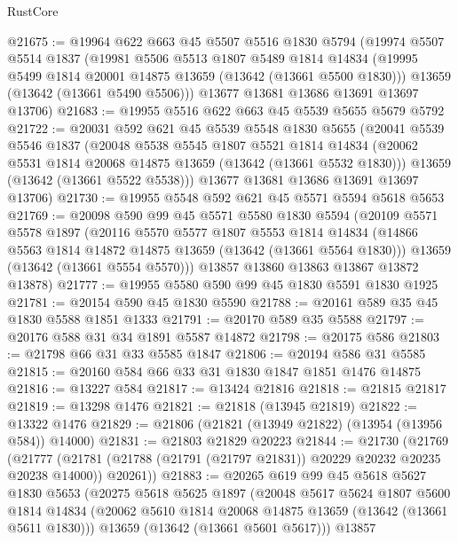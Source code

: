 \begin{lexlean}{RustCore}
\begin{coremodule}
@21675 := @19964
    @622
    @663
    @45
    @5507
    @5516
    @1830
    @5794
    (@19974
      @5507
      @5514
      @1837
      (@19981
        @5506
        @5513
        @1807
        @5489
        @1814
        @14834
        (@19995 @5499 @1814 @20001 @14875 @13659 (@13642 (@13661 @5500 @1830)))
        @13659
        (@13642 (@13661 @5490 @5506)))
      @13677
      @13681
      @13686
      @13691
      @13697
      @13706)
@21683 := @19955 @5516 @622 @663 @45 @5539 @5655 @5679 @5792
@21722 := @20031
    @592
    @621
    @45
    @5539
    @5548
    @1830
    @5655
    (@20041
      @5539
      @5546
      @1837
      (@20048
        @5538
        @5545
        @1807
        @5521
        @1814
        @14834
        (@20062 @5531 @1814 @20068 @14875 @13659 (@13642 (@13661 @5532 @1830)))
        @13659
        (@13642 (@13661 @5522 @5538)))
      @13677
      @13681
      @13686
      @13691
      @13697
      @13706)
@21730 := @19955 @5548 @592 @621 @45 @5571 @5594 @5618 @5653
@21769 := @20098
    @590
    @99
    @45
    @5571
    @5580
    @1830
    @5594
    (@20109
      @5571
      @5578
      @1897
      (@20116
        @5570
        @5577
        @1807
        @5553
        @1814
        @14834
        (@14866 @5563 @1814 @14872 @14875 @13659 (@13642 (@13661 @5564 @1830)))
        @13659
        (@13642 (@13661 @5554 @5570)))
      @13857
      @13860
      @13863
      @13867
      @13872
      @13878)
@21777 := @19955 @5580 @590 @99 @45 @1830 @5591 @1830 @1925
@21781 := @20154 @590 @45 @1830 @5590
@21788 := @20161 @589 @35 @45 @1830 @5588 @1851 @1333
@21791 := @20170 @589 @35 @5588
@21797 := @20176 @588 @31 @34 @1891 @5587 @14872
@21798 := @20175 @586
@21803 := @21798 @66 @31 @33 @5585 @1847
@21806 := @20194 @586 @31 @5585
@21815 := @20160 @584 @66 @33 @31 @1830 @1847 @1851 @1476 @14875
@21816 := @13227 @584
@21817 := @13424 @21816
@21818 := @21815 @21817
@21819 := @13298 @1476
@21821 := @21818 (@13945 @21819)
@21822 := @13322 @1476
@21829 := @21806 (@21821 (@13949 @21822) (@13954 (@13956 @584)) @14000)
@21831 := @21803 @21829 @20223
@21844 := @21730
    (@21769
      (@21777 (@21781 (@21788 (@21791 (@21797 @21831)) @20229 @20232 @20235 @20238 @14000)) @20261))
@21883 := @20265
    @619
    @99
    @45
    @5618
    @5627
    @1830
    @5653
    (@20275
      @5618
      @5625
      @1897
      (@20048
        @5617
        @5624
        @1807
        @5600
        @1814
        @14834
        (@20062 @5610 @1814 @20068 @14875 @13659 (@13642 (@13661 @5611 @1830)))
        @13659
        (@13642 (@13661 @5601 @5617)))
      @13857

\end{coremodule}
\end{lexlean}
